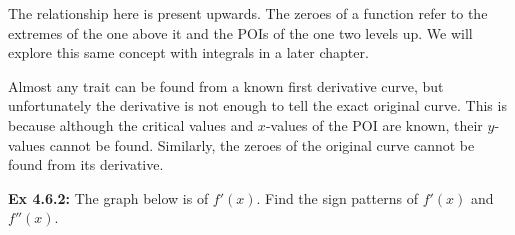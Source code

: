 The relationship here is present upwards. The zeroes of a function refer to the extremes of the one above it and the POIs of the one two levels up. We will explore this same concept with integrals in a later chapter. \par 

Almost any trait can be found from a known first derivative curve, but unfortunately the derivative is not enough to tell the exact original curve. This is because although the critical values and $x$-values of the POI are known, their $y$-values cannot be found. Similarly, the zeroes of the original curve cannot be found from its derivative. \par 

\begin{tcolorbox}[example]
    \textbf{Ex 4.6.2: } The graph below is of $f'(x)$. Find the sign patterns of $f'(x)$ and $f''(x)$. \\
    \begin{center}
    \end{center}
\end{tcolorbox}
